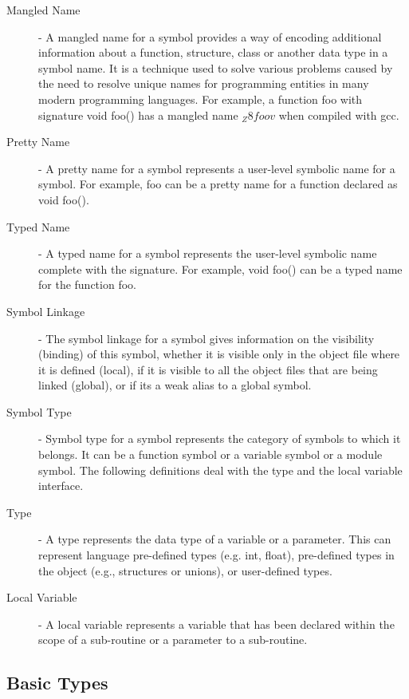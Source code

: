 \begin{description}
\item[Mangled Name] - A mangled name for a symbol provides a way of encoding additional information about a function, structure, class or another data type in a symbol name. It is a technique used to solve various problems caused by the need to resolve unique names for programming entities in many modern programming languages. For example, a function foo with signature void foo() has a mangled name $_Z8foov$ when compiled with gcc.
\item[Pretty Name] - A pretty name for a symbol represents a user-level symbolic name for a symbol. For example, foo can be a pretty name for a function declared as void foo().
\item[Typed Name] - A typed name for a symbol represents the user-level symbolic name complete with the signature. For example, void foo() can be a typed name for the function foo.
\item[Symbol Linkage] - The symbol linkage for a symbol gives information on the visibility (binding) of this symbol, whether it is visible only in the object file where it is defined (local), if it is visible to all the object files that are being linked (global), or if its a weak alias to a global symbol.
\item[Symbol Type] - Symbol type for a symbol represents the category of symbols to which it belongs. It can be a function symbol or a variable symbol or a module symbol.
The following definitions deal with the type and the local variable interface.
\item[Type] - A type represents the data type of a variable or a parameter. This can represent language pre-defined types (e.g. int, float), pre-defined types in the object (e.g., structures or unions), or user-defined types.
\item[Local Variable] - A local variable represents a variable that has been declared within the scope of a sub-routine or a parameter to a sub-routine.
\end{description}

\subsection{Basic Types}

